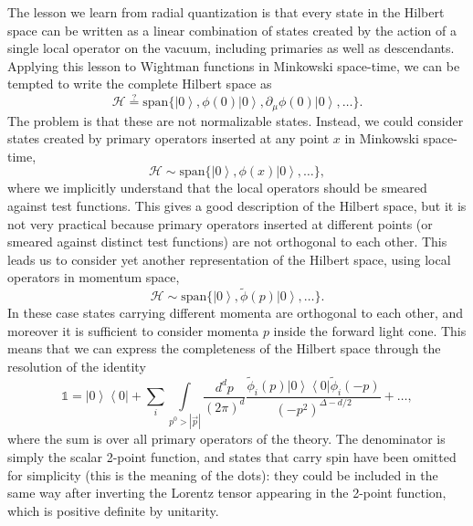 \documentclass[a4paper,12pt]{article}
\newcommand{\ket}[1]{\left| #1 \right\rangle}
\newcommand{\bra}[1]{\left\langle #1 \right|}
\numberwithin{equation}{section}
\begin{document}
The lesson we learn from radial quantization is that every state in the Hilbert space can be written as a linear combination of states created by the action of a single local operator on the vacuum, including primaries as well as descendants. Applying this lesson to Wightman functions in Minkowski space-time, we can be tempted to write the complete Hilbert space as
\begin{equation}
	\mathscr{H} \stackrel{?}{=} \text{span}\big\{
	\ket{0}, 
	\phi(0) \ket{0}, 
	\partial_\mu \phi(0) \ket{0}, 
	\ldots
	\big\}.
	\label{eq:localstates}
\end{equation}
The problem is that these are not normalizable states. Instead, we could consider states created by primary operators inserted at any point $x$ in Minkowski space-time,
\begin{equation}
	\mathscr{H} \sim \text{span}\big\{
	\ket{0}, 
	\phi(x) \ket{0}, 
	\ldots
	\big\},
\end{equation}
where we implicitly understand that the local operators should be smeared against test functions. This gives a good description of the Hilbert space, but it is not very practical because primary operators inserted at different points (or smeared against distinct test functions) are not orthogonal to each other.
This leads us to consider yet another representation of the Hilbert space, using local operators in momentum space,
\begin{equation}
	\mathscr{H} \sim \text{span}\big\{
	\ket{0}, 
	\widetilde{\phi}(p) \ket{0}, 
	\ldots
	\big\}.
\end{equation}
In these case states carrying different momenta are orthogonal to each other, and moreover it is sufficient to consider momenta $p$ inside the forward light cone.
This means that we can express the completeness of the Hilbert space through the resolution of the identity
\begin{equation}
	\mathds{1} = \ket{0} \bra{0}
	+ \sum_i \int\limits_{p^0 > \left| \vec{p} \right|} \!\! 
	\frac{d^dp}{(2\pi)^d}
	\frac{\widetilde{\phi}_i(p) \ket{0} \bra{0} \widetilde{\phi}_i(-p) }
	{(-p^2)^{\Delta - d/2}}
	+ \ldots,
\end{equation}
where the sum is over all primary operators of the theory.
The denominator is simply the scalar 2-point function, and states that carry spin have been omitted for simplicity (this is the meaning of the dots): they could be included in the same way after inverting the  Lorentz tensor appearing in the 2-point function, which is positive definite by unitarity.
\end{document}
